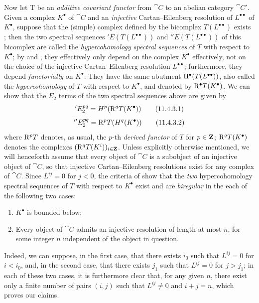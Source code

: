 \begin{env}[11.4.3]
\label{0.11.4.3}
Now let T be an \emph{additive covariant functor} from $\cat{C}$ to an abelian category $\cat{C'}$.
Given a complex $K^\bullet$ of $\cat{C}$ and an \emph{injective} Cartan--Eilenberg resolution of $L^{\bullet\bullet}$ of $K^{\bullet}$, suppose that the (simple) complex defined by the bicomplex $T(L^{\bullet\bullet})$ exists ;
then the two spectral sequences $'E(T(L^{\bullet\bullet}))$ and $''E(T(L^{\bullet\bullet}))$ of this bicomplex are called the \emph{hypercohomology spectral sequences} of $T$ with respect to $K^\bullet$;
by  and , they effectively only depend on the complex $K^\bullet$ effectively, not on the choice of the injective Cartan--Eilenberg resolution $L^{\bullet\bullet}$;
furthermore, they depend \emph{functorially} on $K^\bullet$.
They have the same abutment $\mathrm{H}^\bullet(T(L^{\bullet\bullet}))$, also called the \emph{hypercohomology} of $T$ with respect to $K^\bullet$, and denoted by $\mathrm{R}^\bullet T(K^\bullet)$.
We can show that the $E_2$ terms of the two spectral sequences above are given by 
\[
\label{0.11.4.3.1}
  'E_2^{pq}
  = H^p(\mathrm{R}^q T(K^\bullet))
\tag{11.4.3.1}
\]
\[
\label{0.11.4.3.2}
  ''E_2^{pq}
  = \mathrm{R}^p T(H^q(K^\bullet))
\tag{11.4.3.2}
\]
where $\mathrm{R}^p T$ denotes, as usual, the $p$-th \emph{derived functor} of $T$ for $p\in\mathbf{Z}$;
$\mathrm{R}^q T(K^\bullet)$ denotes the complexes $(\mathrm{R}^q T(K^i))_{i\in\mathbf{Z}}$.
Unless explicitly otherwise mentioned, we will henceforth assume that every object of $\cat{C}$ is a subobject of an injective object of $\cat{C}$, so that injective Cartan--Eilenberg resolutions exist for any complex of $\cat{C}$.
Since $L^{ij}=0$ for $j<0$, the criteria of  show that the \emph{two} hypercohomology spectral sequences of $T$ with respect to $K^\bullet$ exist and are \emph{biregular} in the each of the following two cases:
\begin{enumerate}
  \item $K^\bullet$ is bounded below;
  \item Every object of $\cat{C}$ admits an injective resolution of length at most $n$, for some integer $n$ independent of the object in question.
\end{enumerate}
Indeed, we can suppose, in the first case, that  there exists $i_0$ such that $L^{ij}=0$ for $i<i_0$, and, in the second case, that there exists $j_1$ such that $L^{ij}=0$ for $j>j_1$;
in each of these two cases, it is furthermore clear that, for any given $n$, there exist only a finite number of pairs $(i,j)$ such that $L^{ij}\neq 0$ and $i+j=n$, which proves our claims.


\end{env}
